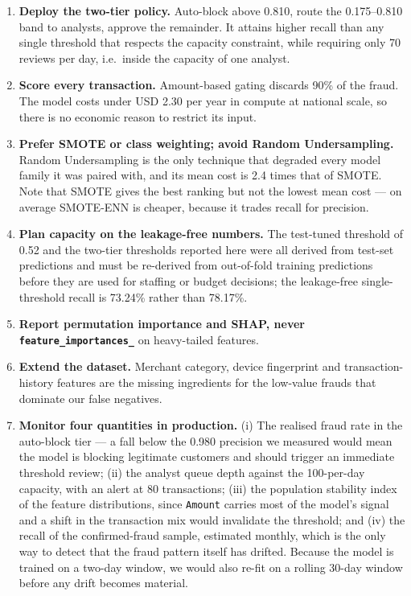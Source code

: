\begin{enumerate}
    \item \textbf{Deploy the two-tier policy.} Auto-block above 0.810, route
    the 0.175--0.810 band to analysts, approve the remainder. It attains higher
    recall than any single threshold that respects the capacity constraint,
    while requiring only 70 reviews per day, i.e.\ inside the capacity of one
    analyst.
    \item \textbf{Score every transaction.} Amount-based gating discards 90\% of
    the fraud. The model costs under USD 2.30 per year in compute at national
    scale, so there is no economic reason to restrict its input.
    \item \textbf{Prefer SMOTE or class weighting; avoid Random Undersampling.}
    Random Undersampling is the only technique that degraded every model
    family it was paired with, and its mean cost is 2.4 times that of SMOTE.
    Note that SMOTE gives the best ranking but not the lowest mean cost --- on
    average SMOTE-ENN is cheaper, because it trades recall for precision.
    \item \textbf{Plan capacity on the leakage-free numbers.} The test-tuned
    threshold of 0.52 and the two-tier thresholds reported here were all
    derived from test-set predictions and must be re-derived from out-of-fold
    training predictions before they are used for staffing or budget decisions;
    the leakage-free single-threshold recall is 73.24\% rather than 78.17\%.
    \item \textbf{Report permutation importance and SHAP, never
    \texttt{feature\_importances\_}} on heavy-tailed features.
    \item \textbf{Extend the dataset.} Merchant category, device fingerprint
    and transaction-history features are the missing ingredients for the
    low-value frauds that dominate our false negatives.
    \item \textbf{Monitor four quantities in production.} (i) The realised
    fraud rate in the auto-block tier --- a fall below the 0.980 precision we
    measured would mean the model is blocking legitimate customers and should
    trigger an immediate threshold review; (ii) the analyst queue depth
    against the 100-per-day capacity, with an alert at 80 transactions; (iii)
    the population stability index of the feature distributions, since
    \texttt{Amount} carries most of the model's signal and a shift in the
    transaction mix would invalidate the threshold; and (iv) the recall of the
    confirmed-fraud sample, estimated monthly, which is the only way to
    detect that the fraud pattern itself has drifted. Because the model is
    trained on a two-day window, we would also re-fit on a rolling 30-day
    window before any drift becomes material.
\end{enumerate}

